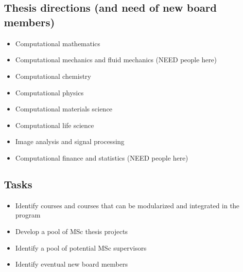 \documentclass[%
oneside,                 %
final,                   %
10pt]{article}
\begin{document}
\noindent




\subsection*{Thesis directions (and need of new board members)}

\paragraph{}
\begin{itemize}
\item Computational mathematics

\item Computational mechanics and fluid mechanics  (NEED people here)

\item Computational chemistry

\item Computational physics

\item Computational materials science

\item Computational life science

\item Image analysis and signal processing

\item Computational finance and statistics   (NEED people here)
\end{itemize}

\noindent



\subsection*{Tasks}

\paragraph{}
\begin{itemize}
\item Identify courses and courses that can be modularized and integrated in the program

\item Develop a pool of MSc thesis projects  

\item Identify a pool of potential MSc supervisors

\item Identify eventual new board members
\end{itemize}

\noindent









\cleardoublepage{}  %
\printindex
\end{document}
